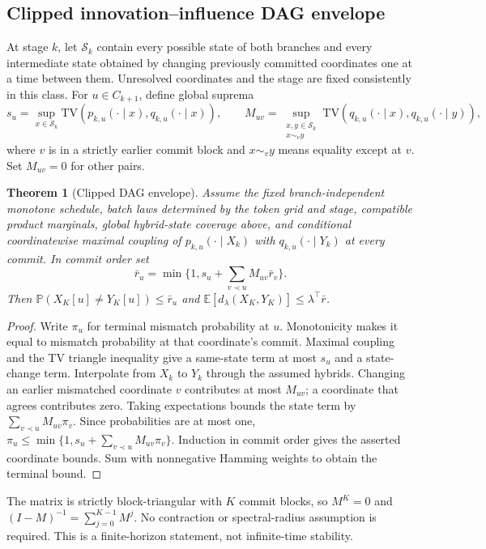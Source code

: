 \documentclass[11pt,a4paper]{article}
\theoremstyle{plain}
\newtheorem{theorem}{Theorem}[section]
\theoremstyle{definition}
\theoremstyle{remark}
\newcommand{\TV}{\mathrm{TV}}
\newcommand{\Ex}{\mathbb{E}}
\newcommand{\Prob}{\mathbb{P}}
\begin{document}
\subsection{Clipped innovation--influence DAG envelope}
At stage $k$, let $\mathcal S_k$ contain every possible state of both branches
and every intermediate state obtained by changing previously committed
coordinates one at a time between them. Unresolved coordinates and the stage
are fixed consistently in this class. For $u\in C_{k+1}$, define global suprema
\[
 s_u=\sup_{x\in\mathcal S_k}\TV(p_{k,u}(\cdot\mid x),q_{k,u}(\cdot\mid x)),
\qquad
 M_{uv}=\sup_{\substack{x,y\in\mathcal S_k\\x\sim_v y}}
 \TV(q_{k,u}(\cdot\mid x),q_{k,u}(\cdot\mid y)),
\]
where $v$ is in a strictly earlier commit block and $x\sim_v y$ means equality
except at $v$. Set $M_{uv}=0$ for other pairs.
\begin{theorem}[Clipped DAG envelope]
\label{thm:dag}
Assume the fixed branch-independent monotone schedule, batch laws determined
by the token grid and stage, compatible product marginals, global hybrid-state
coverage above, and conditional coordinatewise maximal
coupling of $p_{k,u}(\cdot\mid X_k)$ with $q_{k,u}(\cdot\mid Y_k)$ at every
commit. In commit order set
\[
 \bar r_u=\min\{1,s_u+\sum_{v\prec u}M_{uv}\bar r_v\}.
\]
Then $\Prob(X_K[u]\neq Y_K[u])\leq\bar r_u$ and
$\Ex[d_\lambda(X_K,Y_K)]\leq\lambda^\top\bar r$.
\end{theorem}
\begin{proof}
Write $\pi_u$ for terminal mismatch probability at $u$. Monotonicity makes it
equal to mismatch probability at that coordinate's commit. Maximal coupling
and the TV triangle inequality give a same-state term at most $s_u$ and a
state-change term. Interpolate from $X_k$ to $Y_k$ through the assumed hybrids.
Changing an earlier mismatched coordinate $v$ contributes at most $M_{uv}$;
a coordinate that agrees contributes zero. Taking expectations bounds the
state term by $\sum_{v\prec u}M_{uv}\pi_v$. Since probabilities are at most
one, $\pi_u\leq\min\{1,s_u+\sum_{v\prec u}M_{uv}\pi_v\}$.
Induction in commit order gives the asserted coordinate bounds. Sum with
nonnegative Hamming weights to obtain the terminal bound.
\end{proof}
The matrix is strictly block-triangular with $K$ commit blocks, so $M^K=0$ and
$(I-M)^{-1}=\sum_{j=0}^{K-1}M^j$. No contraction or spectral-radius assumption
is required. This is a finite-horizon statement, not infinite-time stability.
\end{document}
